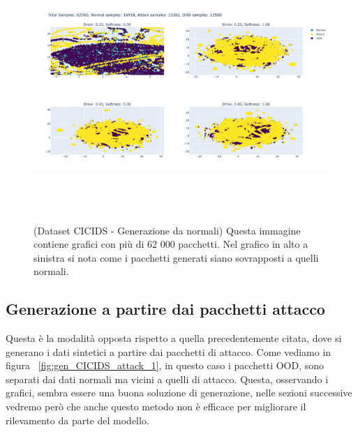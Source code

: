 \begin{figure}[htpb]
    \centering
    \includegraphics[width=\textwidth,height=10cm,keepaspectratio=true]{img/gen_test/cicids/CICIDS18_normal_only_12k_ood.png}
    \caption{
      (Dataset CICIDS - Generazione da normali) Questa immagine contiene grafici con più di 62 000 pacchetti. Nel grafico in alto a sinistra si nota come i pacchetti generati siano sovrapposti a quelli normali.
    }
    \label{fig:gen_CICIDS_norm_2}
\end{figure}


\subsection{Generazione a partire dai pacchetti attacco}

Questa è la modalità opposta rispetto a quella precedentemente citata, dove si generano i dati sintetici a partire dai pacchetti di attacco. Come vediamo in figura ~\ref{fig:gen_CICIDS_attack_1}, in questo caso i pacchetti OOD, sono separati dai dati normali ma vicini a quelli di attacco. Questa, osservando i grafici, sembra essere una buona soluzione di generazione, nelle sezioni successive vedremo però che anche questo metodo non è efficace per migliorare il rilevamento da parte del modello.


